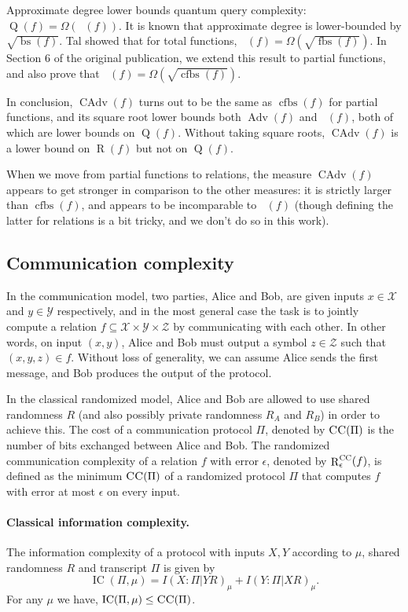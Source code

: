 \documentclass[10pt,a4paper]{article}
\theoremstyle{definition}
\newcommand{\X}{\mathcal{X}}
\newcommand{\Y}{\mathcal{Y}}
\newcommand{\Z}{\mathcal{Z}}
\newcommand{\CC}{\textsc{CC}}
\renewcommand{\>}{\rangle}
\newcommand{\<}{\langle}
\DeclareMathOperator{\R}{R}
\DeclareMathOperator{\Q}{Q}
\DeclareMathOperator{\bs}{bs}
\DeclareMathOperator{\fbs}{fbs}
\DeclareMathOperator{\cfbs}{cfbs}
\DeclareMathOperator{\Adv}{Adv}
\DeclareMathOperator{\CAdv}{CAdv}
\DeclareMathOperator{\IC}{IC}
\DeclareMathOperator{\adeg}{\widetilde{\deg}}
\begin{document}
Approximate degree lower bounds quantum query complexity:
$\Q(f)=\Omega(\adeg(f))$.
It is known \cite{BBC+01} that approximate
degree is lower-bounded by $\sqrt{\bs(f)}$.
Tal \cite{Tal13} showed that for total functions,
$\adeg(f)=\Omega(\sqrt{\fbs(f)})$.
In Section 6 of the original publication, we extend this result to partial
functions, and also prove that
$\adeg(f)=\Omega(\sqrt{\cfbs(f)})$.

In conclusion, $\CAdv(f)$ turns out to be the same
as $\cfbs(f)$ for partial functions,
and its square root lower bounds both
$\Adv(f)$ and $\adeg(f)$, both of which are lower bounds
on $\Q(f)$. Without taking square roots,
$\CAdv(f)$ is a lower bound on $\R(f)$
but not on $\Q(f)$.

When we move from partial functions
to relations, the measure $\CAdv(f)$ appears to get stronger
in comparison to the other measures: it is
strictly larger than $\cfbs(f)$, and appears to be
incomparable to $\adeg(f)$ (though defining the
latter for relations is a bit tricky, and we don't
do so in this work).


\subsection{Communication complexity}

In the communication model, two parties, Alice and Bob, are given inputs $x\in\X$ and $y\in\Y$ respectively, and in the most general case the task is to jointly compute a relation $f\subseteq \X\times\Y\times\Z$ by communicating with each other. In other words, on input $(x,y)$,
Alice and Bob must output a symbol
$z\in\Z$ such that $(x,y,z)\in f$.
Without loss of generality, we can assume Alice sends the first message, and Bob produces the output of the protocol.

In the classical randomized model, Alice and Bob are allowed to use shared randomness $R$ (and also possibly private randomness $R_A$ and $R_B$) in order to achieve this. The cost of a communication protocol $\Pi$, denoted by $\CC(\Pi)$ is the number of bits exchanged between Alice and Bob. The randomized communication complexity of a relation $f$ with error $\epsilon$, denoted by $\R^\CC_\epsilon(f)$, is defined as the minimum $\CC(\Pi)$ of a randomized protocol $\Pi$ that computes $f$ with error at most $\epsilon$ on every input.

\paragraph{Classical information complexity.} The information complexity of a protocol with inputs $X,Y$ according to $\mu$, shared randomness $R$ and transcript $\Pi$ is given by
\[ \IC(\Pi,\mu) = I(X:\Pi|YR)_\mu + I(Y:\Pi|XR)_\mu.\]
For any $\mu$ we have, $\IC(\Pi,\mu) \leq \CC(\Pi)$.
\end{document}
